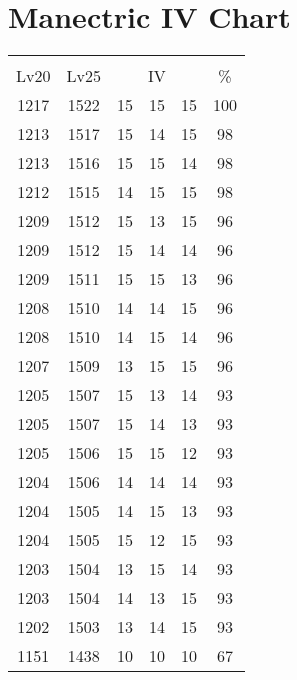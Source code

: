 \documentclass{article}%
\begin{document}
%
\normalsize%
\section{Manectric IV Chart}%
\label{sec:Manectric IV Chart}%
\renewcommand{\arraystretch}{1.5}%
\begin{tabular}{|c|c|c|c|c|c|}%
\hline%
\multicolumn{6}{|c|}{\textcolor{white}{ 
\linebreak{Manectric}
}%
\cellcolor{black}}\\%
\multicolumn{1}{|c}{Lv20}&\multicolumn{1}{c|}{Lv25}&\multicolumn{3}{c|}{IV}&\multicolumn{1}{|c|}{\%}\\%
\hline%
\rowcolor{color100}%
1217&1522&15&15&15&100\\%
\hline%
\rowcolor{color98}%
1213&1517&15&14&15&98\\%
\hline%
\rowcolor{color98}%
1213&1516&15&15&14&98\\%
\hline%
\rowcolor{color98}%
1212&1515&14&15&15&98\\%
\hline%
\rowcolor{color96}%
1209&1512&15&13&15&96\\%
\hline%
\rowcolor{color96}%
1209&1512&15&14&14&96\\%
\hline%
\rowcolor{color96}%
1209&1511&15&15&13&96\\%
\hline%
\rowcolor{color96}%
1208&1510&14&14&15&96\\%
\hline%
\rowcolor{color96}%
1208&1510&14&15&14&96\\%
\hline%
\rowcolor{color96}%
1207&1509&13&15&15&96\\%
\hline%
\rowcolor{color93}%
1205&1507&15&13&14&93\\%
\hline%
\rowcolor{color93}%
1205&1507&15&14&13&93\\%
\hline%
\rowcolor{color93}%
1205&1506&15&15&12&93\\%
\hline%
\rowcolor{color93}%
1204&1506&14&14&14&93\\%
\hline%
\rowcolor{color93}%
1204&1505&14&15&13&93\\%
\hline%
\rowcolor{color93}%
1204&1505&15&12&15&93\\%
\hline%
\rowcolor{color93}%
1203&1504&13&15&14&93\\%
\hline%
\rowcolor{color93}%
1203&1504&14&13&15&93\\%
\hline%
\rowcolor{color93}%
1202&1503&13&14&15&93\\%
\hline%
\rowcolor{color91}%
1151&1438&10&10&10&67\\%
\end{tabular}

%
\end{document}
